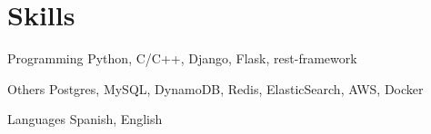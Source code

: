
\section{Skills}

  \cvitem
    {Programming}
    {Python, C/C++, Django, Flask, rest-framework}

  \cvitem
    {Others}
    {Postgres, MySQL, DynamoDB, Redis, ElasticSearch, AWS, Docker}

  \cvitem
    {Languages} %
    {Spanish, English} %

